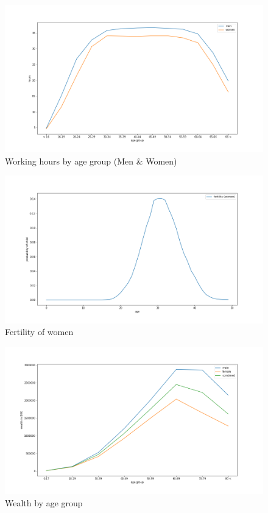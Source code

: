 \begin{figure}
    \centering
    \includegraphics[scale=0.4]{figures/men_vs_women_hours_empirical.png}
    \caption{Working hours by age group (Men \& Women)}
    \label{fig:women_vs_men_hours_emmpirical}
\end{figure}

\begin{figure}
    \centering
    \includegraphics[scale=0.4]{figures/fertility_women_empirical.png}
    \caption{Fertility of women}
    \label{fig:fertility_by_women}
\end{figure}

\begin{figure}
    \centering
    \includegraphics[scale=0.4]{figures/wealth_by_age_group_empirical.png}
    \caption{Wealth by age group}
    \label{fig:wealth_by_age_group_empirical}
\end{figure}
\fi


